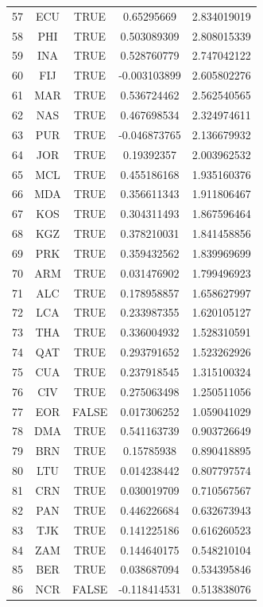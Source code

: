 \documentclass[12pt]{article}
\begin{document}
\begin{longtable}{|c|c|c|c|c|}
57 & ECU & TRUE & 0.65295669 & 2.834019019 \\
58 & PHI & TRUE & 0.503089309 & 2.808015339 \\
59 & INA & TRUE & 0.528760779 & 2.747042122 \\
60 & FIJ & TRUE & -0.003103899 & 2.605802276 \\
61 & MAR & TRUE & 0.536724462 & 2.562540565 \\
62 & NAS & TRUE & 0.467698534 & 2.324974611 \\
63 & PUR & TRUE & -0.046873765 & 2.136679932 \\
64 & JOR & TRUE & 0.19392357 & 2.003962532 \\
65 & MCL & TRUE & 0.455186168 & 1.935160376 \\
66 & MDA & TRUE & 0.356611343 & 1.911806467 \\
67 & KOS & TRUE & 0.304311493 & 1.867596464 \\
68 & KGZ & TRUE & 0.378210031 & 1.841458856 \\
69 & PRK & TRUE & 0.359432562 & 1.839969699 \\
70 & ARM & TRUE & 0.031476902 & 1.799496923 \\
71 & ALC & TRUE & 0.178958857 & 1.658627997 \\
72 & LCA & TRUE & 0.233987355 & 1.620105127 \\
73 & THA & TRUE & 0.336004932 & 1.528310591 \\
74 & QAT & TRUE & 0.293791652 & 1.523262926 \\
75 & CUA & TRUE & 0.237918545 & 1.315100324 \\
76 & CIV & TRUE & 0.275063498 & 1.250511056 \\
77 & EOR & FALSE & 0.017306252 & 1.059041029 \\
78 & DMA & TRUE & 0.541163739 & 0.903726649 \\
79 & BRN & TRUE & 0.15785938 & 0.890418895 \\
80 & LTU & TRUE & 0.014238442 & 0.807797574 \\
81 & CRN & TRUE & 0.030019709 & 0.710567567 \\
82 & PAN & TRUE & 0.446226684 & 0.632673943 \\
83 & TJK & TRUE & 0.141225186 & 0.616260523 \\
84 & ZAM & TRUE & 0.144640175 & 0.548210104 \\
85 & BER & TRUE & 0.038687094 & 0.534395846 \\
86 & NCR & FALSE & -0.118414531 & 0.513838076 \\

\end{longtable}
\end{document}
